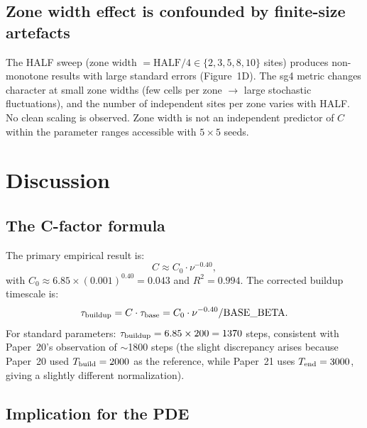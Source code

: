 \documentclass[11pt]{article}
\begin{document}
\subsection{Zone width effect is confounded by finite-size artefacts}

The HALF sweep (zone width $= \mathrm{HALF}/4 \in \{2, 3, 5, 8, 10\}$ sites)
produces non-monotone results with large standard errors (Figure~1D).
The sg4 metric changes character at small zone widths (few cells per zone $\to$
large stochastic fluctuations), and the number of independent sites per zone
varies with HALF.
No clean scaling is observed.
Zone width is not an independent predictor of $C$ within the parameter ranges
accessible with $5 \times 5$ seeds.

\section{Discussion}

\subsection{The C-factor formula}

The primary empirical result is:
\begin{equation}
  C \approx C_0 \cdot \nu^{-0.40},
  \label{eq:C}
\end{equation}
with $C_0 \approx 6.85 \times (0.001)^{0.40} = 0.043$ and $R^2 = 0.994$.
The corrected buildup timescale is:
\begin{equation}
  \tau_{\rm buildup} = C \cdot \tau_{\rm base}
  = C_0 \cdot \nu^{-0.40} / \mathrm{BASE\_BETA}.
\end{equation}
For standard parameters: $\tau_{\rm buildup} = 6.85 \times 200 = 1370$ steps,
consistent with Paper~20's observation of $\sim$1800 steps (the slight discrepancy
arises because Paper~20 used $T_{\rm build}=2000$ as the reference, while
Paper~21 uses $T_{\rm end}=3000$, giving a slightly different normalization).

\subsection{Implication for the PDE}
\end{document}
